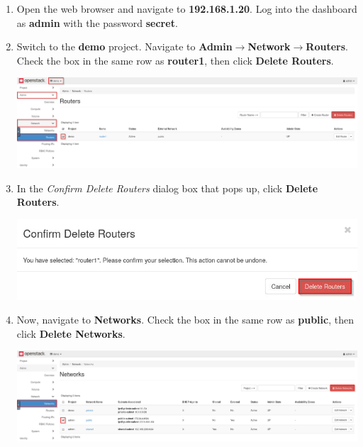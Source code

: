 \documentclass[letterpaper, 12pt]{article}
\begin{document}
\begin{enumerate}
    \item Open the web browser and navigate to \textbf{192.168.1.20}. Log into the dashboard as \textbf{admin} with the
    password \textbf{secret}.

    \item Switch to the \textbf{demo} project. Navigate to \textbf{Admin$\rightarrow$Network$\rightarrow$Routers}. Check
    the box in the same row as \textbf{router1}, then click \textbf{Delete Routers}.

    \begin{center}
        \includegraphics[width=\linewidth]{images/part1/step2.png}
    \end{center}

    \item In the \textit{Confirm Delete Routers} dialog box that pops up, click \textbf{Delete Routers}.

    \begin{center}
        \includegraphics[width=\linewidth]{images/part1/step3.png}
    \end{center}

    \item Now, navigate to \textbf{Networks}. Check the box in the same row as \textbf{public}, then click
    \textbf{Delete Networks}.

    \begin{center}
        \includegraphics[width=\linewidth]{images/part1/step4.png}
    \end{center}


\end{enumerate}
\end{document}

